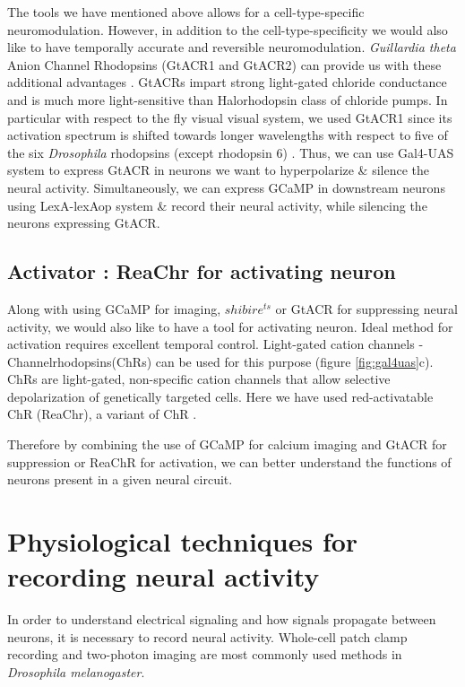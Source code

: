 The tools we have mentioned above allows for a cell-type-specific neuromodulation. However, in addition to the cell-type-specificity we would also like to have temporally accurate and reversible neuromodulation. \textit{Guillardia theta} Anion Channel Rhodopsins (GtACR1 and GtACR2) can provide us with these additional advantages \parencite{Govorunova2015}. GtACRs impart strong light-gated chloride conductance and is much more light-sensitive than Halorhodopsin class of chloride pumps. In particular with respect to the fly visual visual system, we used GtACR1 since its activation spectrum is shifted towards longer wavelengths with respect to five of the six \textit{Drosophila} rhodopsins (except rhodopsin 6) \parencite{Mauss2017, Mohammad2017}. Thus, we can use Gal4-UAS system to express GtACR in neurons we want to hyperpolarize \& silence the neural activity. Simultaneously, we can express GCaMP in downstream neurons using LexA-lexAop system \& record their neural activity, while silencing the neurons expressing GtACR. 

 
\subsection{Activator : ReaChr for activating neuron}
Along with using GCaMP for imaging, $shibire^{ts}$ or GtACR for suppressing neural activity, we would also like to have a tool for activating neuron. Ideal method for activation requires excellent temporal control. Light-gated cation channels - Channelrhodopsins(ChRs) can be used for this purpose (figure  \ref{fig:gal4uas}c). ChRs are light-gated, non-specific cation channels that allow selective depolarization of genetically targeted cells. Here we have used red-activatable ChR (ReaChr), a variant of ChR \parencite{Lin2013, Busch2018}. 

Therefore by combining the use of GCaMP for calcium imaging and GtACR for suppression or ReaChR for activation, we can better understand the functions of neurons present in a given neural circuit.

\section{Physiological techniques for recording neural activity}
In order to understand electrical signaling and how signals propagate between neurons, it is necessary to record neural activity. Whole-cell patch clamp recording and two-photon imaging are most commonly used methods in \textit{Drosophila melanogaster}.

